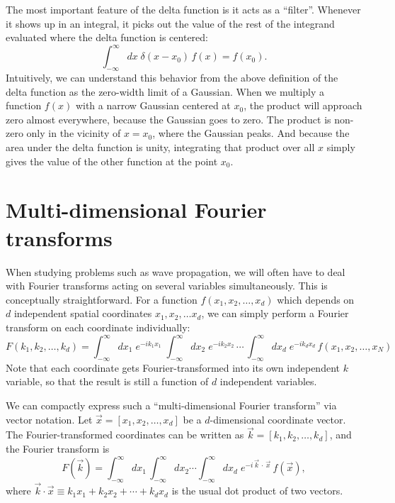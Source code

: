 \documentclass[10pt,a4paper]{article}
\begin{document}
The most important feature of the delta function is it acts as a
``filter''. Whenever it shows up in an integral, it picks out the
value of the rest of the integrand evaluated where the delta function
is centered:
\begin{equation}
  \int_{-\infty}^\infty  dx \; \delta(x-x_0)\, f(x) = f(x_0).
\end{equation}
Intuitively, we can understand this behavior from the above definition
of the delta function as the zero-width limit of a Gaussian. When we
multiply a function $f(x)$ with a narrow Gaussian centered at $x_0$,
the product will approach zero almost everywhere, because the Gaussian
goes to zero. The product is non-zero only in the vicinity of $x =
x_0$, where the Gaussian peaks. And because the area under the delta
function is unity, integrating that product over all $x$ simply gives
the value of the other function at the point $x_0$.

\section{Multi-dimensional Fourier transforms}
\label{multi-dimensional-fourier-transforms}

When studying problems such as wave propagation, we will often have to
deal with Fourier transforms acting on several variables
simultaneously.  This is conceptually straightforward. For a function
$f(x_1, x_2, \dots, x_d)$ which depends on $d$ independent spatial
coordinates $x_1, x_2, \dots x_d$, we can simply perform a Fourier
transform on each coordinate individually:
\begin{equation}
  F(k_1, k_2, \dots, k_d) = \int_{-\infty}^\infty dx_1\; e^{-ik_1x_1}\;
  \int_{-\infty}^\infty dx_2\; e^{-ik_2x_2}\,\cdots\, \int_{-\infty}^\infty dx_d\;
  e^{-ik_d x_d}\, f(x_1,x_2, \dots,x_N)
\end{equation}
Note that each coordinate gets Fourier-transformed into its own
independent $k$ variable, so that the result is still a function of
$d$ independent variables.

We can compactly express such a ``multi-dimensional Fourier
transform'' via vector notation. Let $\vec{x} = [x_1, x_2, \dots,
  x_d]$ be a $d$-dimensional coordinate vector. The
Fourier-transformed coordinates can be written as $\vec{k} = [k_1,
  k_2, \dots, k_d]$, and the Fourier transform is
\begin{equation}
  F(\vec{k}) = \int_{-\infty}^\infty dx_1\, \int_{-\infty}^\infty dx_2 \cdots
  \int_{-\infty}^\infty dx_d\; e^{-i\,\vec{k}\,\cdot\,\vec{x}}\, f(\vec{x}),
\end{equation}
where $\vec{k}\cdot\vec{x} \equiv k_1 x_1 + k_2 x_2 + \cdots + k_d
x_d$ is the usual dot product of two vectors.
\end{document}
